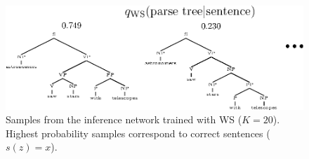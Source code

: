 \begin{figure}[t]
  \centering
  \includegraphics[width=0.95\linewidth]{figures/RRWS/pcfg/ws_q_samples.eps}
  \caption{
    Samples from the inference network trained with \gls{WS} ($K = 20$).
    Highest probability samples correspond to correct sentences ($s(z) = x$).
  }
  \label{fig:experiments/pcfg/ws_q_samples}
  \vspace*{-2ex}
\end{figure}



